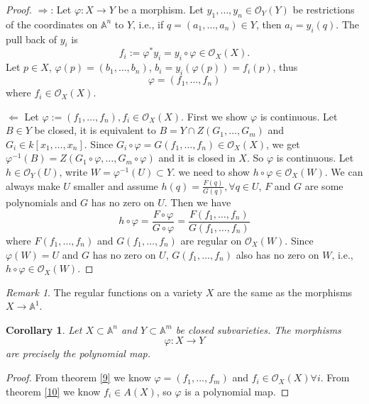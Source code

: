 \documentclass{amsart}
\theoremstyle{plain}
\newtheorem{corollary}{Corollary}
\theoremstyle{definition}
\theoremstyle{remark}
\newtheorem*{remark}{Remark}
\numberwithin{equation}{section}
\begin{document}
\begin{proof}
	$ \Rightarrow $: Let $ \varphi :X\to Y $ be a morphism. Let $ y_1,\dots, y_n \in \mathcal{O}_Y(Y)$ be restrictions of the coordinates on $ \mathbb{A}^n $ to $ Y $, i.e., if $ q=(a_1,\dots,a_n)\in Y $, then $ a_i=y_i(q) $. The pull back of $ y_i $ is 
	\begin{equation}
	f_i:=\varphi^\ast y_i=y_i\circ \varphi \in \mathcal{O}_X(X).
	\end{equation}
	Let $ p\in X $, $ \varphi(p)=(b_1,\dots,b_n) $, $ b_i=y_i(\varphi(p))=f_i(p) $, thus
	$$
	\varphi= (f_1,\dots,f_n)
	$$
	where $ f_i\in \mathcal{O}_X(X) $.
	
	$ \Leftarrow $ Let $ \varphi :=(f_1,\dots,f_n),f_i\in \mathcal{O}_X(X) $. First we show $ \varphi  $  is continuous. Let $ B\in Y $ be closed, it is equivalent to $ B=Y\cap Z(G_1,\dots,G_m) $ and $ G_i\in k[x_1,\dots,x_n] $. Since 
	$ G_i\circ \varphi = G(f_1,\dots,f_n)\in \mathcal{O}_X(X) $, we get $ \varphi^{-1}(B)=Z(G_1\circ \varphi,\dots,G_m\circ\varphi) $ and it is closed in $ X $. So $ \varphi $ is continuous. Let $ h\in \mathcal{O}_Y(U) $, write $ W=\varphi^{-1}(U)\subset Y $. we need to show $ h\circ \varphi \in \mathcal{O}_X(W) $. We can always make $ U $ smaller and assume $ h(q)=\frac{F(q)}{G(q)} ,\forall q\in U$, $ F $ and $ G $ are some polynomials and $ G $ has no zero on $ U $. Then we have
	\begin{equation}
	h\circ \varphi =\frac{F\circ \varphi}{G\circ \varphi}=\frac{F(f_1,\dots,f_n)}{G(f_1,\dots,f_n)}
	\end{equation}   
	where $ F(f_1,\dots,f_n) $ and $ G(f_1,\dots,f_n) $ are regular on $ \mathcal{O}_X(W) $. Since $ \varphi(W)=U $ and $ G $ has no zero on $ U $, $ G(f_1,\dots,f_n) $ also has no zero on $ W $, i.e., $ h\circ \varphi\in \mathcal{O}_X(W) $.
\end{proof}
\begin{remark}
	The regular functions on a variety $ X $ are the same as the morphisms $ X\to \mathbb{A}^1 $.
\end{remark}
\begin{corollary}
	Let $ X\subset \mathbb{A}^n $ and $ Y\subset \mathbb{A}^m $ be closed subvarieties. The morphisms 
	$$
	\varphi:X\to Y
	$$
	are precisely the polynomial map.
\end{corollary}
\begin{proof}
 From theorem \ref{9} we know $ \varphi=(f_1,\dots,f_m) $ and $ f_i\in \mathcal{O}_X(X) \forall i$. From theorem \ref{10} we know $ f_i\in A(X) $, so $ \varphi $ is a polynomial map.
\end{proof}
\end{document}
